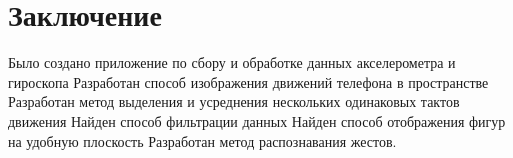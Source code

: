 \section{Заключение}

Было создано приложение по сбору и обработке данных акселерометра и гироскопа
Разработан способ изображения движений телефона в пространстве
Разработан метод выделения и усреднения нескольких одинаковых тактов движения
Найден способ фильтрации данных
Найден способ отображения фигур на удобную плоскость
Разработан метод распознавания жестов.